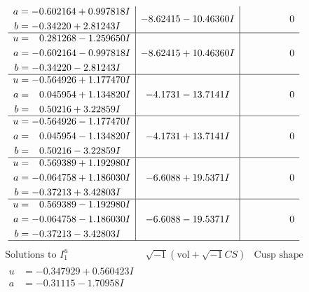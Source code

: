 \documentclass[1p]{elsarticle_modified}
\theoremstyle{definition}
\newcommand{\I}{\sqrt{-1}}
\begin{document}
$$\begin{array}{c|c|c}
\begin{aligned}
a &= -0.602164 + 0.997818 I \\
b &= -0.34220 + 2.81243 I\end{aligned}
 & -8.62415 - 10.46360 I & \phantom{-0.000000 } 0 \\ \hline\begin{aligned}
u &= \phantom{-}0.281268 - 1.259650 I \\
a &= -0.602164 - 0.997818 I \\
b &= -0.34220 - 2.81243 I\end{aligned}
 & -8.62415 + 10.46360 I & \phantom{-0.000000 } 0 \\ \hline\begin{aligned}
u &= -0.564926 + 1.177470 I \\
a &= \phantom{-}0.045954 + 1.134820 I \\
b &= \phantom{-}0.50216 + 3.22859 I\end{aligned}
 & -4.1731 - 13.7141 I & \phantom{-0.000000 } 0 \\ \hline\begin{aligned}
u &= -0.564926 - 1.177470 I \\
a &= \phantom{-}0.045954 - 1.134820 I \\
b &= \phantom{-}0.50216 - 3.22859 I\end{aligned}
 & -4.1731 + 13.7141 I & \phantom{-0.000000 } 0 \\ \hline\begin{aligned}
u &= \phantom{-}0.569389 + 1.192980 I \\
a &= -0.064758 + 1.186030 I \\
b &= -0.37213 + 3.42803 I\end{aligned}
 & -6.6088 + 19.5371 I & \phantom{-0.000000 } 0 \\ \hline\begin{aligned}
u &= \phantom{-}0.569389 - 1.192980 I \\
a &= -0.064758 - 1.186030 I \\
b &= -0.37213 - 3.42803 I\end{aligned}
 & -6.6088 - 19.5371 I & \phantom{-0.000000 } 0\\
 \hline 
 \end{array}$$\newpage$$\begin{array}{c|c|c}  
\text{Solutions to }I^u_{1}& \I (\text{vol} + \sqrt{-1}CS) & \text{Cusp shape}\\
 \hline 
\begin{aligned}
u &= -0.347929 + 0.560423 I \\
a &= -0.31115 - 1.70958 I \\

\end{aligned}
\end{array}$$
\end{document}
